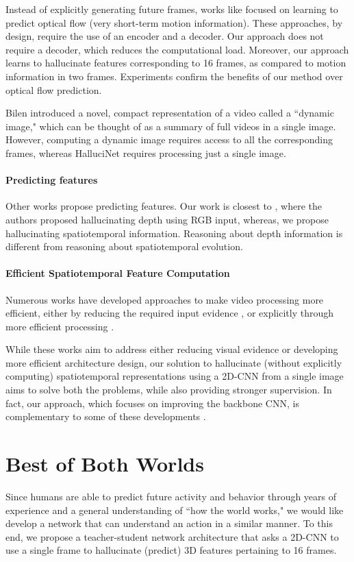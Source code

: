 \documentclass[10pt,twocolumn,letterpaper]{article}
\begin{document}
Instead of explicitly generating future frames, works like \cite{walker2014patch, walker, pintea2014deja, im2flow} focused on learning to predict optical flow (very short-term motion information). These approaches, by design, require the use of an encoder and a decoder. Our approach does not require a decoder, which reduces the computational load. Moreover, our approach learns to hallucinate features corresponding to 16 frames, as compared to motion information in two frames. Experiments confirm the benefits of our method over optical flow prediction. 

Bilen \etal \cite{bilen2016dynamic} introduced a novel, compact representation of a video called a ``dynamic image," which can be thought of as a summary of full videos in a single image. However, computing a dynamic image requires access to all the corresponding frames, whereas HalluciNet requires processing just a single image.
\paragraph{Predicting features}
Other works \cite{actions_xforms, hoffman, cv_anticipating} propose predicting features. Our work is closest to \cite{hoffman}, where the authors proposed hallucinating depth using RGB input, whereas, we propose hallucinating spatiotemporal information. Reasoning about depth information is different from reasoning about spatiotemporal evolution.
\paragraph{Efficient Spatiotemporal Feature Computation} 
Numerous works have developed approaches to make video processing more efficient, either by reducing the required input evidence \cite{tsd, bhardwaj, mars, d3d}, or explicitly through more efficient processing \cite{sun2015human, tran2018closer, p3d, mict, xie2018rethinking, lightweight_wang, lee2018motion, tsm}. 

While these works aim to address either reducing visual evidence or developing more efficient architecture design, our solution to hallucinate (without explicitly computing) spatiotemporal representations using a 2D-CNN from a single image aims to solve both the problems, while also providing stronger supervision. In fact, our approach, which focuses on improving the backbone CNN, is complementary to some of these developments \cite{trn, tsm}. \section{Best of Both Worlds}
Since humans are able to predict future activity and behavior through years of experience and a general understanding of ``how the world works," we would like develop a network that can understand an action in a similar manner.  To this end, we propose a teacher-student network architecture that asks a 2D-CNN to use a single frame to hallucinate (predict) 3D features pertaining to 16 frames.
\end{document}
